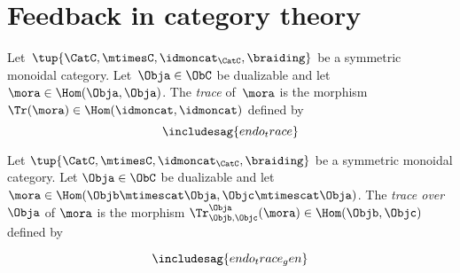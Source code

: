 

\section{Feedback in category theory}

\begin{ctdefinition}
  \label{def:trace_endo}
Let~$\tup{\CatC,\mtimesC,\idmoncat_{\CatC}, \braiding}$ be a symmetric monoidal category.
  Let~$\Obja \in \ObC$ be dualizable and let~$\mora \in \Hom(\Obja, \Obja)$. The \emph{trace} of~$\mora$ is the morphism~$\Tr(\mora) \in \Hom(\idmoncat, \idmoncat)$ defined by
\begin{equation}
\includesag{endo_trace}
\end{equation}
\end{ctdefinition}

\begin{ctdefinition}
  \label{def:trace_gen_endo}
Let $\tup{\CatC,\mtimesC,\idmoncat_{\CatC}, \braiding}$ be a symmetric monoidal category. Let $\Obja \in \ObC$ be dualizable and let $\mora \in \Hom(\Objb \mtimescat \Obja, \Objc \mtimescat \Obja)$. The \emph{trace over} $\Obja$ of $\mora$ is the morphism $\Tr_{\Objb, \Objc}^\Obja (\mora) \in \Hom(\Objb, \Objc)$ defined by

  \begin{equation}
\includesag{endo_trace_gen}
\end{equation}
\end{ctdefinition}

